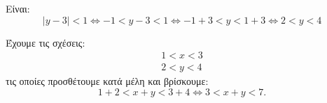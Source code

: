 
\begin{alist}
\item Είναι:
\[|y - 3| < 1 \Leftrightarrow -1 < y - 3 < 1 \Leftrightarrow -1 + 3 < y < 1 + 3 \Leftrightarrow 2 < y < 4\]

\item Έχουμε τις σχέσεις:
\begin{gather*}
1 < x < 3 \\
2 < y < 4
\end{gather*}
τις οποίες προσθέτουμε κατά μέλη και βρίσκουμε:
\[1 + 2 < x + y < 3 + 4 \Leftrightarrow 3 < x + y < 7.\]
\end{alist}

